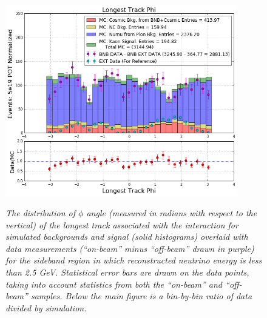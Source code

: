 \begin{figure}[ht!]
\centering
	\includegraphics[width=0.9\textwidth]{Figures/kaon_sideband_comp_phi.png} \\
\caption{\textit{The distribution of $\phi$ angle (measured in radians with respect to the vertical) of the longest track associated with the interaction for simulated backgrounds and signal (solid histograms) overlaid with data measurements (``on-beam'' minus ``off-beam'' drawn in purple) for the sideband region in which reconstructed neutrino energy is less than 2.5 GeV. Statistical error bars are drawn on the data points, taking into account statistics from both the ``on-beam'' and ``off-beam'' samples. Below the main figure is a bin-by-bin ratio of data divided by simulation.}}\label{kaon_sideband_comp_phi}
\end{figure}


